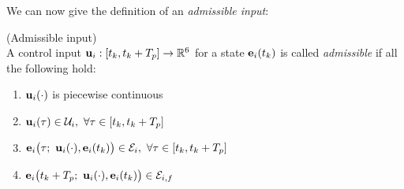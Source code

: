 We can now give the definition of an \textit{admissible input}:

\begin{bw_box}
\begin{definition} (Admissible input)\\

  A control input $\bm{\mathbf{u}}_i : [t_k, t_k + T_p] \to \mathbb{R}^6$ for a state
  $\bm{\mathbf{e}}_i(t_k)$ is called \textit{admissible} if all the following hold:

  \begin{enumerate}
    \item $\bm{\mathbf{u}}_i(\cdot)$ is piecewise continuous
    \item $\vect{u}_i(\tau) \in \mathcal{U}_i,\ \forall \tau \in [t_k, t_k + T_p]$
    \item $\vect{e}_i\big(\tau;\ \vect{u}_i(\cdot), \vect{e}_i(t_k)\big) \in \mathcal{E}_i,\ \forall \tau \in [t_k, t_k + T_p]$
    \item $\vect{e}_i\big(t_k + T_p;\ \vect{u}_i(\cdot), \vect{e}_i(t_k)\big) \in \mathcal{E}_{i,f}$
  \end{enumerate}

\end{definition}
\end{bw_box}
